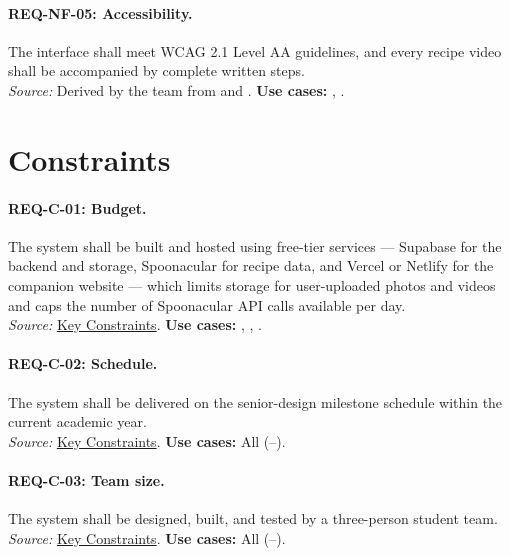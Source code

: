 \paragraph{REQ-NF-05: Accessibility.}
 The interface shall meet WCAG 2.1 Level AA guidelines, and every recipe video shall be accompanied by complete written steps.\\
\textit{Source:} Derived by the team from  and . \textbf{Use cases:} , .

\section{Constraints}

\paragraph{REQ-C-01: Budget.}
 The system shall be built and hosted using free-tier services --- Supabase for the backend and storage, Spoonacular for recipe data, and Vercel or Netlify for the companion website --- which limits storage for user-uploaded photos and videos and caps the number of Spoonacular API calls available per day.\\
\textit{Source:} \hyperref[Chapter:KeyConstraints]{Key Constraints}. \textbf{Use cases:} , , .

\paragraph{REQ-C-02: Schedule.}
 The system shall be delivered on the senior-design milestone schedule within the current academic year.\\
\textit{Source:} \hyperref[Chapter:KeyConstraints]{Key Constraints}. \textbf{Use cases:} All (--).

\paragraph{REQ-C-03: Team size.}
 The system shall be designed, built, and tested by a three-person student team.\\
\textit{Source:} \hyperref[Chapter:KeyConstraints]{Key Constraints}. \textbf{Use cases:} All (--).

